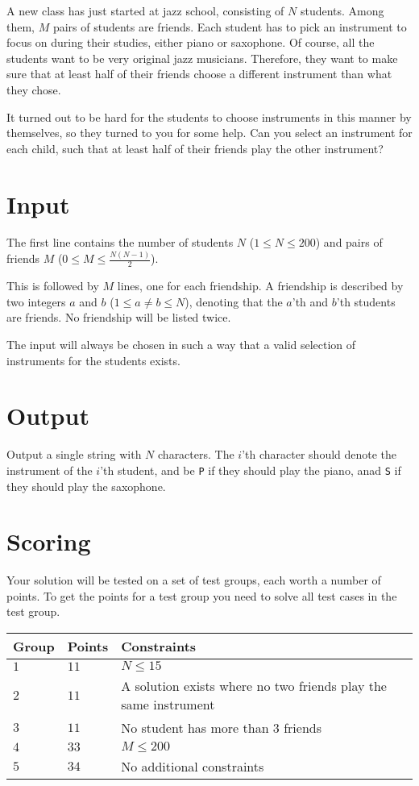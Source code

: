 A new class has just started at jazz school, consisting of $N$ students.
Among them, $M$ pairs of students are friends.
Each student has to pick an instrument to focus on during their studies, either piano or saxophone.
Of course, all the students want to be very original jazz musicians.
Therefore, they want to make sure that at least half of their friends choose a different instrument than what they chose.

It turned out to be hard for the students to choose instruments in this manner by themselves, so they turned to you for some help.
Can you select an instrument for each child, such that at least half of their friends play the other instrument?

\section*{Input}
The first line contains the number of students $N$ ($1 \le N \le 200$) and pairs of friends $M$ ($0 \le M \le \frac{N(N - 1)}{2}$).

This is followed by $M$ lines, one for each friendship.
A friendship is described by two integers $a$ and $b$ ($1 \le a \neq b \le N$), denoting that the $a$'th and $b$'th students are friends.
No friendship will be listed twice.

The input will always be chosen in such a way that a valid selection of instruments for the students exists.

\section*{Output}
Output a single string with $N$ characters.
The $i$'th character should denote the instrument of the $i$'th student, and be \texttt{P} if they should play the piano, anad \texttt{S} if they should play the saxophone.

\section*{Scoring}
Your solution will be tested on a set of test groups, each worth a number of points.
To get the points for a test group you need to solve all test cases in the test group.

\noindent
\begin{tabular}{| l | l | l |}
  \hline
  Group & Points & Constraints \\ \hline
  $1$    & $11$        &  $N \le 15$ \\ \hline
  $2$    & $11$        &  A solution exists where no two friends play the same instrument \\ \hline
  $3$    & $11$        &  No student has more than 3 friends \\ \hline
  $4$    & $33$        &  $M \le 200$ \\ \hline
  $5$    & $34$        &  No additional constraints \\ \hline
\end{tabular}

